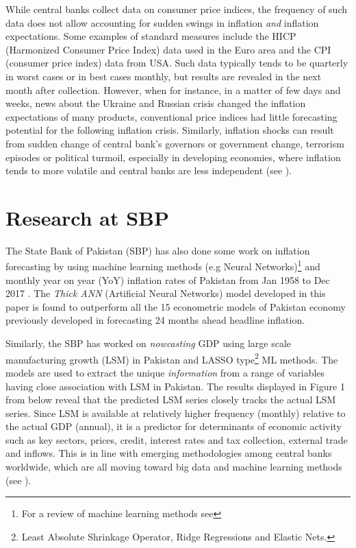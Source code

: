 \documentclass[12pt]{article}
\newcommand{\1}{\mathbbm 1}
\begin{document}
		
		While central banks collect data on consumer price indices, the frequency of such data does not allow accounting for sudden swings in inflation \textit{and} inflation expectations. Some examples of standard measures include the HICP (Harmonized Consumer Price Index) data used in the Euro area and the CPI (consumer price index) data from USA. Such data typically tends to be quarterly in worst cases or in best cases monthly, but results are revealed in the next month after collection. However, when for instance, in a matter of few days and weeks, news about the Ukraine and Russian crisis changed the inflation expectations of many products, conventional price indices had little forecasting potential for the following inflation crisis. Similarly, inflation shocks can result from sudden change of central bank's governors or government change, terrorism episodes or political turmoil, especially in developing economies, where inflation tends to more volatile and central banks are less independent (see \cite{vuletin2011replacing}).
		
		
		\section{Research at SBP}
		
		
		
		The State Bank of Pakistan (SBP) has also done some work on inflation forecasting by using machine learning methods (e.g Neural Networks)\footnote{For a review of machine learning methods see} and monthly year on year (YoY) inflation rates of Pakistan from Jan 1958 to Dec 2017 \cite{hanif2018thick}. The \textit{Thick ANN} (Artificial Neural Networks) model developed in this paper is found to outperform all the 15 econometric models of Pakistan economy previously developed in forecasting 24 months ahead headline inflation.
		
		Similarly, the SBP has worked on \textit{nowcasting} GDP using large scale manufacturing growth (LSM) in Pakistan \cite{hussain2018nowcasting} and LASSO type\footnote{Least Absolute Shrinkage Operator, Ridge Regressions and Elastic Nets.} ML methods. The models are used to extract the unique \textit{information} from a range of variables having close association with LSM in Pakistan. The results displayed in Figure 1 from \cite{hussain2018nowcasting} below reveal that the predicted LSM series closely tracks the actual LSM series. Since LSM is available at relatively higher frequency (monthly) relative to the actual GDP (annual), it is a predictor for determinants of economic activity such as key sectors, prices, credit, interest rates and tax collection, external trade and inflows. This is in line with emerging methodologies among central banks worldwide, which are all moving toward big data and machine learning methods (see \cite{doerr2021big}). 
		
\end{document}
